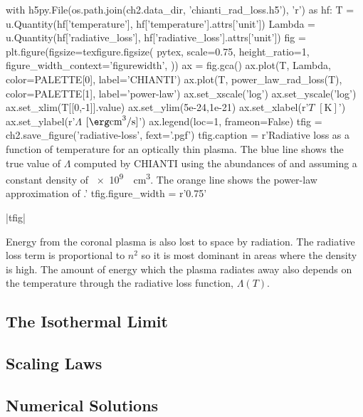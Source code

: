 \begin{pycode}[chapter2]
with h5py.File(os.path.join(ch2.data_dir, 'chianti_rad_loss.h5'), 'r') as hf:
    T = u.Quantity(hf['temperature'], hf['temperature'].attrs['unit'])
    Lambda = u.Quantity(hf['radiative_loss'], hf['radiative_loss'].attrs['unit'])
fig = plt.figure(figsize=texfigure.figsize(
    pytex,
    scale=0.75,
    height_ratio=1,
    figure_width_context='figurewidth',
))
ax = fig.gca()
ax.plot(T, Lambda, color=PALETTE[0], label='CHIANTI')
ax.plot(T, power_law_rad_loss(T), color=PALETTE[1], label='power-law')
ax.set_xscale('log')
ax.set_yscale('log')
ax.set_xlim(T[[0,-1]].value)
ax.set_ylim(5e-24,1e-21)
ax.set_xlabel(r'$T$ $[\si{\kelvin}]$')
ax.set_ylabel(r'$\Lambda$ $[\si{\erg\cubic\cm\per\second}]$')
ax.legend(loc=1, frameon=False)
tfig = ch2.save_figure('radiative-loss', fext='.pgf')
tfig.caption = r'Radiative loss as a function of temperature for an optically thin plasma. The blue line shows the true value of $\Lambda$ computed by CHIANTI using the abundances of \citet{feldman_potential_1992} and assuming a constant density of \SI{e9}{\per\cubic\cm}. The orange line shows the power-law approximation of \citet{klimchuk_highly_2008}.'
tfig.figure_width = r'0.75\textwidth'
\end{pycode}
\py[chapter2]|tfig|

Energy from the coronal plasma is also lost to space by radiation. The radiative loss term is proportional to $n^2$ so it is most dominant in areas where the density is high. The amount of energy which the plasma radiates away also depends on the temperature through the radiative loss function, $\Lambda(T)$.

\subsection{The Isothermal Limit}\label{sec:isothermal}

\subsection{Scaling Laws}\label{sec:scaling_laws}


\subsection{Numerical Solutions}\label{sec:hydrostatic_numerical}

